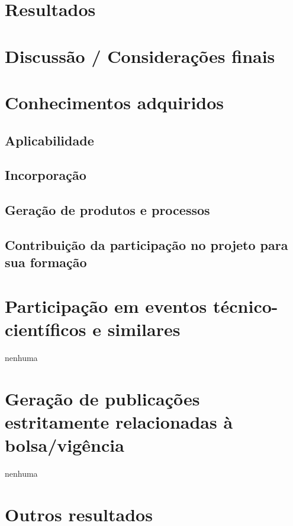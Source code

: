 \documentclass{article}
\begin{document}
\section{Resultados}

\section{Discussão / Considerações finais}

\section{Conhecimentos adquiridos}
\subsection{Aplicabilidade}
\subsection{Incorporação}
\subsection{Geração de produtos e processos}
\subsection{Contribuição da participação no projeto para sua formação}


\section{Participação em eventos técnico-científicos e similares}
nenhuma

\section{Geração de publicações estritamente relacionadas à bolsa/vigência}
nenhuma

\section{Outros resultados}
\end{document}
